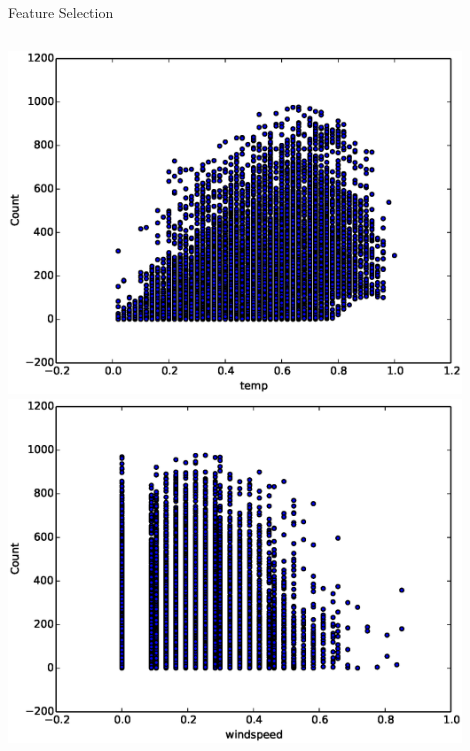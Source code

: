\documentclass[pdf]{beamer}
\begin{document}
\begin{frame}{Feature Selection}
\begin{columns}
\begin{center}
\includegraphics[width=0.9\textwidth]{plots/temp_v_Count_corrcheck.eps}\\
\includegraphics[width=0.9\textwidth]{plots/windspeed_v_Count_corrcheck.eps}
\end{center}
\end{columns}
\end{frame}

\end{document}
